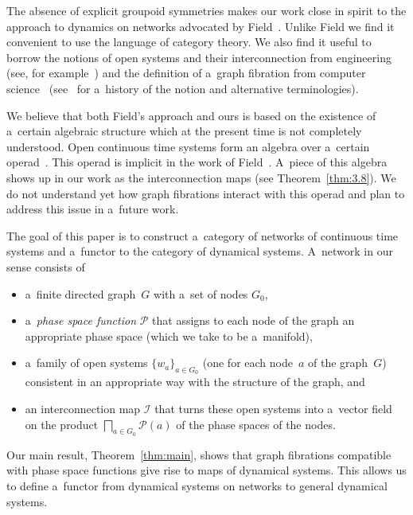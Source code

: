 \documentclass[10pt,a4paper]{amsart}
\numberwithin{equation}{section}
\begin{document}
The absence of explicit groupoid symmetries makes our work close in spirit to the approach to dynamics on networks
advocated by Field~\cite{FieldCD}.
Unlike Field we f\/ind it convenient to use the language of category theory.
We also f\/ind it useful to borrow the notions of open systems and their interconnection from engineering (see, for
example~\cite{Brockett, Pappas, willems}) and the def\/inition of a~graph f\/ibration from computer science~\cite{Vigna1}
(see~\cite{VignaFibPage} for a~history of the notion and alternative terminologies).

We believe that both Field's approach and ours is based on the existence of a~certain algebraic structure which at the
present time is not completely understood.
Open continuous time systems form an algebra over a~certain operad~\cite{VSL}.
This operad is implicit in the work of Field~\cite{FieldCD}.
A~piece of this algebra shows up in our work as the interconnection maps (see Theorem~\ref{thm:3.8}).
We do not understand yet how graph f\/ibrations interact with this operad and plan to address this issue in a~future work.

The goal of this paper is to construct a~category of networks of continuous time systems and a~functor to the category
of dynamical systems.
A~network in our sense consists of
\begin{itemize}\itemsep=0pt

\item a~f\/inite directed graph~$G$ with a~set of nodes $G_0$,

\item a~{\em phase space function} ${\mathcal P}$ that assigns to each node of the graph an appropriate phase space
(which we take to be a~manifold),

\item a~family of open systems $\{w_a\}_{a\in G_0}$ (one for each node~$a$ of the graph~$G$) consistent in an
appropriate way with the structure of the graph, and

\item an interconnection map $\mathscr{I}$ that turns these open systems into a~vector f\/ield on the product
$\bigsqcap\limits_{a\in G_0} {\mathcal P} (a)$ of the phase spaces of the nodes.
\end{itemize}
Our main result, Theorem~\ref{thm:main}, shows that graph f\/ibrations compatible with phase space functions give rise to
maps of dynamical systems.
This allows us to def\/ine a~functor from dynamical systems on networks to general dynamical systems.
\end{document}

